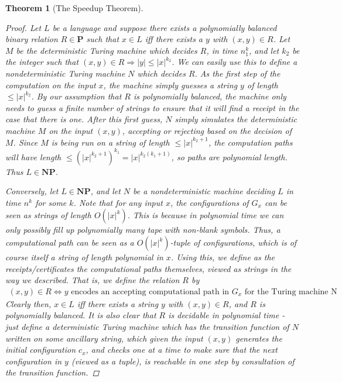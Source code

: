 \documentclass{article}
\theoremstyle{definition}
\theoremstyle{plain}
\theoremstyle{theorem}
\newtheorem{theorem}{Theorem}[section]
\begin{document}
\begin{theorem}[The Speedup Theorem]
\begin{proof}
    Let $L$ be a language and suppose there exists a polynomially balanced binary relation $R \in \textbf{P}$ such that $x \in L$ iff there exists a $y$ with $(x,y) \in R$. Let $M$ be the deterministic Turing machine which decides $R$, in time $n^k_1$, and let $k_2$ be the integer such that $(x,y) \in R \Rightarrow |y| \leq |x|^{k_2}$. We can easily use this to define a nondeterministic Turing machine $N$ which decides $R$. As the first step of the computation on the input $x$, the machine simply guesses a string $y$ of length $\leq |x|^{k_2}$. By our assumption that $R$ is polynomially balanced, the machine only needs to guess a finite number of strings to ensure that it will find a receipt in the case that there is one. After this first guess, $N$ simply simulates the deterministic machine $M$ on the input $(x,y)$, accepting or rejecting based on the decision of $M$. Since $M$ is being run on a string of length $\leq |x|^{k_2+1}$, the computation paths will have length $\leq (|x|^{k_2+1})^{k_1} = |x|^{k_2(k_1+1)}$, so paths are polynomial length. Thus $L \in \textbf{NP}$. 
    \par Conversely, let $L \in \textbf{NP}$, and let $N$ be a nondeterministic machine deciding $L$ in time $n^k$ for some $k$. Note that for any input $x$, the configurations of $G_x$ can be seen as strings of length $O(|x|^k)$. This is because in polynomial time we can only possibly fill up polynomially many tape with non-blank symbols. Thus, a computational path can be seen as a $O(|x|^k)$-tuple of configurations, which is of course itself a string of length polynomial in $x$. Using this, we define as the receipts/certificates \textit{the computational paths themselves}, viewed as strings in the way we described. That is, we define the relation $R$ by
    \begin{align}
        (x,y) \in R \iff \textrm{$y$ encodes an accepting computational path in $G_x$ for the Turing machine N}
    \end{align}
    Clearly then, $x \in L$ iff there exists a string $y$ with $(x,y) \in R$, and $R$ is polynomially balanced. It is also clear that $R$ is decidable in polynomial time - just define a deterministic Turing machine which has the transition function of $N$ written on some ancillary string, which given the input $(x,y)$ generates the initial configuration $c_x$, and checks one at a time to make sure that the next configuration in $y$ (viewed as a tuple), is reachable in one step by consultation of the transition function. 
\end{proof}

\end{theorem}
\end{document}
